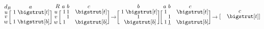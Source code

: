 \documentclass[sn-mathphys]{sn-jnl}
\newcommand\topstrut[1][1.0ex]{\setlength\bigstrutjot{#1}{\bigstrut[t]}}
\newcommand\botstrut[1][0.9ex]{\setlength\bigstrutjot{#1}{\bigstrut[b]}}
\begin{document}
$$
	\def\rowsp{0.4em}
	\def\arraystretch{0.60}
	\makeatletter\setlength\BA@colsep{0.9pt}\makeatother
	\begin{blockarray}{cc}{d_R}
	\kern-0.2em & a \\
		\begin{block}{c[c]}
  		u \kern \rowsp & \; 1 \; \topstrut \\
  		v \kern \rowsp & \;  \; \\
  		w \kern \rowsp & \; 1 \; \botstrut \\
		\end{block}
	\end{blockarray}
	\; \;
	\begin{blockarray}{cccc}{R}
	 \kern-0.2em & a & b & c  \\
		\begin{block}{c[ccc]}
  		u \kern \rowsp & \; 1 & 1 &  \hphantom{1} \; \topstrut \\
  		v \kern \rowsp & \;  & 1 &  \hphantom{1} \; \\
  		w \kern \rowsp & \; 1 &  &  \hphantom{1} \; \botstrut \\
		\end{block}
	\end{blockarray}
\; \to
\begin{blockarray}{cc}{}
	\kern-0.2em & b \\
		\begin{block}{c[c]}
  		  & \; 1 \; \topstrut \\
  		 & \;  1 \; \\
  		 & \; \; \botstrut \\
		\end{block}
	\end{blockarray}
	\; \;
\begin{blockarray}{cccc}{}
	\kern-0.2em & a & b & c  \\
		\begin{block}{c[ccc]}
  		  & \; 1 &    &  \hphantom{1} \; \topstrut \\
  		  & \;    & 1 &  \hphantom{1} \; \\
  		 & \; 1 & \underline{1} &  \hphantom{1} \; \botstrut \\
		\end{block}
	\end{blockarray}
\; \to
	\begin{blockarray}{cc}{}
	\kern-0.2em & c \\
		\begin{block}{c[c]}
  		  & \; \hphantom{1} \; \topstrut \\

\end{block}
\end{blockarray}$$
\end{document}

